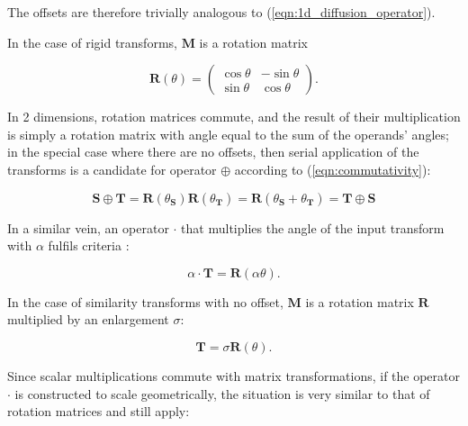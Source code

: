 		The offsets are therefore trivially analogous to (\ref{eqn:1d_diffusion_operator}).
		
		In the case of rigid transforms, $\mathbf{M}$ is a rotation matrix
		
		\begin{equation}
			\mathbf{R}(\theta) = \left( \begin{matrix}
			  										 \cos \theta & -\sin\theta \\
														 \sin\theta & \cos\theta
					                 \end{matrix} \right) .
		\end{equation}
		
		In 2 dimensions, rotation matrices commute, and the result of their multiplication is simply a rotation matrix with angle equal to the sum of the operands' angles; in the special case where there are no offsets, then serial application of the transforms is a candidate for operator $\oplus$ according to (\ref{eqn:commutativity}):
		
		\begin{equation}
			\mathbf{S} \oplus \mathbf{T} = \mathbf{R}(\theta_\mathbf{S})\mathbf{R}(\theta_\mathbf{T}) = \mathbf{R}(\theta_\mathbf{S} + \theta_\mathbf{T}) = \mathbf{T} \oplus \mathbf{S}
		\end{equation}
		
		
		In a similar vein, an operator $\cdot$ that multiplies the angle of the input transform with $\alpha$ fulfils criteria :
    
    \begin{equation}
      \alpha \cdot \mathbf{T} = \mathbf{R}(\alpha\theta).
    \end{equation}
		
        In the case of similarity transforms with no offset, $\mathbf{M}$ is a rotation matrix $\mathbf{R}$ multiplied by an enlargement $\sigma$:
        
        \begin{equation}
            \mathbf{T} = \sigma\mathbf{R}(\theta).
        \end{equation}
        
        Since scalar multiplications commute with matrix transformations, if the operator $\cdot$ is constructed to scale geometrically, the situation is very similar to that of rotation matrices and  still apply:
        
